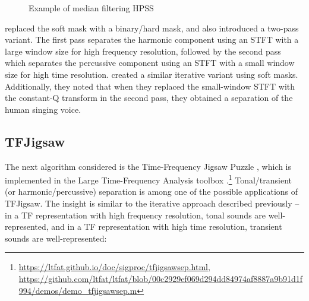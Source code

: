 \documentclass[letter,12pt]{article}
\begin{document}
\begin{figure}[ht]
	\centering
	\caption{Example of median filtering HPSS}
	\label{fig:fitz1}
\end{figure}

\citet{driedger} replaced the soft mask with a binary/hard mask, and also introduced a two-pass variant. The first pass separates the harmonic component using an STFT with a large window size for high frequency resolution, followed by the second pass which separates the percussive component using an STFT with a small window size for high time resolution. \citet{fitzgerald2} created a similar iterative variant using soft masks. Additionally, they noted that when they replaced the small-window STFT with the constant-Q transform in the second pass, they obtained a separation of the human singing voice.

\subsection{TFJigsaw}

The next algorithm considered is the Time-Frequency Jigsaw Puzzle \cite{tfjigsaw}, which is implemented in the Large Time-Frequency Analysis toolbox \cite{ltfat}.\footnote{\url{https://ltfat.github.io/doc/sigproc/tfjigsawsep.html}, \url{https://github.com/ltfat/ltfat/blob/00c2929ef069d294dd84974af8887a9b91d1f994/demos/demo_tfjigsawsep.m}} Tonal/transient (or harmonic/percussive) separation is among one of the possible applications of TFJigsaw. The insight is similar to the iterative approach described previously -- in a TF representation with high frequency resolution, tonal sounds are well-represented, and in a TF representation with high time resolution, transient sounds are well-represented:
\end{document}
